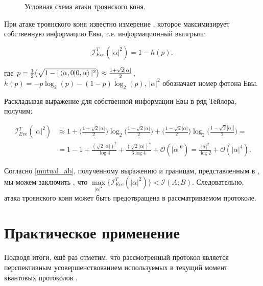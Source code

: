 \documentclass[a4paper,11pt]{article}
\begin{document}
\begin{figure}[h]
	\caption{Условная схема атаки троянского коня.}
	\label{ris:image2}
\end{figure}


При атаке троянского коня известно измерение \cite{trojan, trojan3}, которое максимизирует собственную информацию Евы, т.е. информационный выигрыш:

\begin{equation*}
\mathcal{I}_{Eve}^{T}(|\alpha|^2) = 1 - h(p),
\end{equation*}

где $p = \frac{1}{2} \big(\sqrt{1 - |\braket{\alpha, 0 | 0, \alpha}|^2 } \big) \approx \frac{1 + \sqrt2 |\alpha|}{2}$, $h(p) = -p\log_2(p) - (1-p)\log_2(p)$, $|\alpha|^2$ обозначает номер фотона Евы.

Раскладывая выражение для собственной информации Евы в ряд Тейлора, получим:

\begin{align*}
\mathcal{I}_{Eve}^{T}(|\alpha|^2) &\approx 1 + 
\Big( \frac{1 + \sqrt2 |\alpha|}{2} \Big) \log_2 \Big(\frac{1 + \sqrt2 |\alpha|}{2}\Big) + \Big( \frac{1 - \sqrt2 |\alpha|}{2} \Big) \log_2 \Big(\frac{1 - \sqrt2 |\alpha]|}{2}\Big) = \nonumber \\
&= 1 - 1 + \frac{(\sqrt2 |\alpha|)^2}{\log4} + \frac{(\sqrt2 |\alpha|)^4}{6\log4} + \mathcal{O}(|\alpha|^6) = \frac{|\alpha|^2}{\log2} + \mathcal{O}(|\alpha|^4).
\end{align*}

Согласно \eqref{mutual_ab}, полученному выражению и границам, представленным в \cite{trojan}, мы можем заключить \cite{base}, что $\max\limits_{|\alpha|^2} \big\{\mathcal{I}_{Eve}^{T} (|\alpha|^2) \big\} < \mathcal{I}(A; B)$. Следовательно, атака троянского коня может быть предотвращена в рассматриваемом протоколе.

\section{Практическое применение}\label{practice}
Подводя итоги, ещё раз отметим, что рассмотренный протокол является перспективным усовершенствованием используемых в текущий момент квантовых протоколов \cite{base,Gao}.
\end{document}
